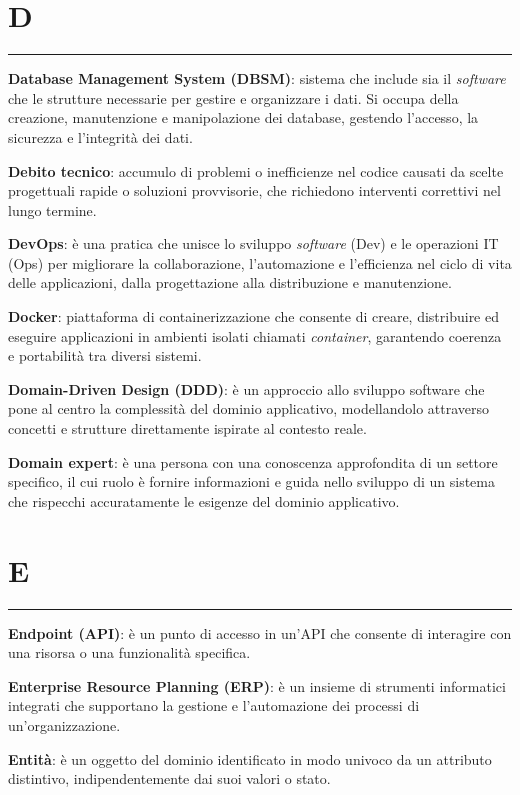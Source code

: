 \section*{D}
{\color{lightgray}\rule{\textwidth}{0.4pt}} %
\begin{glossaryitemize}
    \item \textbf{Database Management System (DBSM)}: sistema che include sia il \textit{software} che le strutture necessarie per gestire e organizzare i dati. Si occupa della creazione, manutenzione e manipolazione dei database, gestendo l'accesso, la sicurezza e l'integrità dei dati.
    \item \textbf{Debito tecnico}: accumulo di problemi o inefficienze nel codice causati da scelte progettuali rapide o soluzioni provvisorie, che richiedono interventi correttivi nel lungo termine.
    \item \textbf{DevOps}: è una pratica che unisce lo sviluppo \textit{software} (Dev) e le operazioni IT (Ops) per migliorare la collaborazione, l'automazione e l'efficienza nel ciclo di vita delle applicazioni, dalla progettazione alla distribuzione e manutenzione.
    \item \textbf{Docker}: piattaforma di containerizzazione che consente di creare, distribuire ed eseguire applicazioni in ambienti isolati chiamati \textit{container}, garantendo coerenza e portabilità tra diversi sistemi.
    \item \textbf{Domain-Driven Design (DDD)}: è un approccio allo sviluppo software che pone al centro la complessità del dominio applicativo, modellandolo attraverso concetti e strutture direttamente ispirate al contesto reale.
    \item \textbf{Domain expert}: è una persona con una conoscenza approfondita di un settore specifico, il cui ruolo è fornire informazioni e guida nello sviluppo di un sistema che rispecchi accuratamente le esigenze del dominio applicativo.
\end{glossaryitemize}

\section*{E}
{\color{lightgray}\rule{\textwidth}{0.4pt}} %
\begin{glossaryitemize}
    \item \textbf{Endpoint (API)}:  è un punto di accesso in un'API che consente di interagire con una risorsa o una funzionalità specifica.
    \item \textbf{Enterprise Resource Planning (ERP)}: è un insieme di strumenti informatici integrati che supportano la gestione e l'automazione dei processi di un'organizzazione. 
    \item \textbf{Entità}: è un oggetto del dominio identificato in modo univoco da un attributo distintivo, indipendentemente dai suoi valori o stato.
\end{glossaryitemize}


